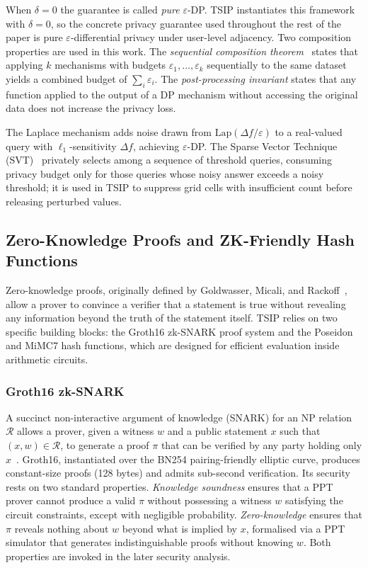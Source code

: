 \documentclass[conference]{IEEEtran}
\theoremstyle{definition}
\theoremstyle{plain}
\begin{document}
When $\delta = 0$ the guarantee is called \emph{pure} $\varepsilon$-DP.
\textsc{TSIP} instantiates this framework with $\delta = 0$, so the concrete
privacy guarantee used throughout the rest of the paper is pure
$\varepsilon$-differential privacy under user-level adjacency.
Two composition properties are used in this work.
The \emph{sequential composition theorem}~\cite{Dwork2014algorithmic}
states that applying $k$ mechanisms with budgets
$\varepsilon_1, \ldots, \varepsilon_k$ sequentially to the same
dataset yields a combined budget of $\sum_i \varepsilon_i$.
The \emph{post-processing invariant} states that any function applied
to the output of a DP mechanism without accessing the original data
does not increase the privacy loss.

The Laplace mechanism adds noise drawn from
$\mathrm{Lap}(\Delta f / \varepsilon)$ to a real-valued query with
$\ell_1$-sensitivity $\Delta f$, achieving $\varepsilon$-DP.
The Sparse Vector Technique (SVT)~\cite{Dwork2014algorithmic}
privately selects among a sequence of threshold queries, consuming
privacy budget only for those queries whose noisy answer exceeds a
noisy threshold; it is used in \textsc{TSIP} to suppress grid cells
with insufficient count before releasing perturbed values.

\subsection{Zero-Knowledge Proofs and ZK-Friendly Hash Functions}\label{sec:prelim-zk}

Zero-knowledge proofs, originally defined by Goldwasser, Micali, and
Rackoff~\cite{Goldwasser1989ZK}, allow a prover to convince a verifier
that a statement is true without revealing any information beyond the
truth of the statement itself.
\textsc{TSIP} relies on two specific building blocks: the Groth16
zk-SNARK proof system and the Poseidon and MiMC7 hash functions,
which are designed for efficient evaluation inside arithmetic circuits.

\subsubsection*{Groth16 zk-SNARK}
A succinct non-interactive argument of knowledge (SNARK) for an
NP relation $\mathcal{R}$ allows a prover, given a witness $w$ and
a public statement $x$ such that $(x, w) \in \mathcal{R}$, to
generate a proof $\pi$ that can be verified by any party holding
only $x$~\cite{Groth2016pairing}.
Groth16, instantiated over the BN254 pairing-friendly elliptic
curve, produces constant-size proofs (128 bytes) and admits
sub-second verification.
Its security rests on two standard properties.
\emph{Knowledge soundness} ensures that a PPT prover cannot produce
a valid $\pi$ without possessing a witness $w$ satisfying the
circuit constraints, except with negligible probability.
\emph{Zero-knowledge} ensures that $\pi$ reveals nothing about $w$
beyond what is implied by $x$, formalised via a PPT simulator that
generates indistinguishable proofs without knowing $w$.
Both properties are invoked in the later security analysis.
\end{document}
